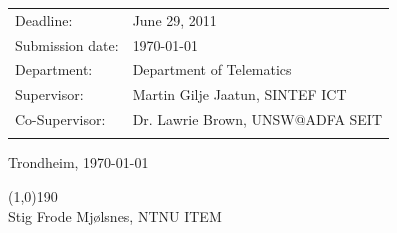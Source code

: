 \begin{titlepage}
\begin{center}
{{\begin{tabular}{p{15cm}}
\end{tabular}  }}

\begin{tabular}{ p{4cm} p{11cm}}
Deadline: & June 29, 2011\\
Submission date: & \today\\
Department: & Department of Telematics\\
Supervisor: & Martin Gilje Jaatun, SINTEF ICT\\
Co-Supervisor: & Dr. Lawrie Brown, UNSW@ADFA SEIT\\\\
\end{tabular}
\vspace{0.5cm}

Trondheim, \today 

\vspace{1cm}
\line(1,0){190} \\
Stig Frode Mj{\o}lsnes, NTNU ITEM

\end{center}
\end{titlepage}

